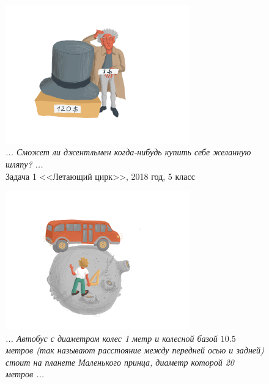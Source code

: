 \documentclass[10pt]{scrbook} \usepackage{modules/nonstahp_book}
\begin{document}
\begin{figure} \begin{center}
	\includegraphics[width=8cm]{figures/color/13}
	\caption{
             {\itshape ... Сможет ли джентльмен когда-нибудь купить себе желанную шляпу? ...}\\
             {Задача 1 <<Летающий цирк>>, 2018 год, 5 класс}}
\end{center} \end{figure}

\begin{figure} \begin{center}
	\includegraphics[width=8cm]{figures/color/14}
	\caption{
             {\itshape ... Автобус с диаметром колес 1 метр и колесной базой $10.5$ метров 
             (так называют расстояние между передней осью и задней) стоит на планете Маленького 
             принца, диаметр которой 20 метров ...}\\
             }
\end{center} \end{figure}
\end{document}
